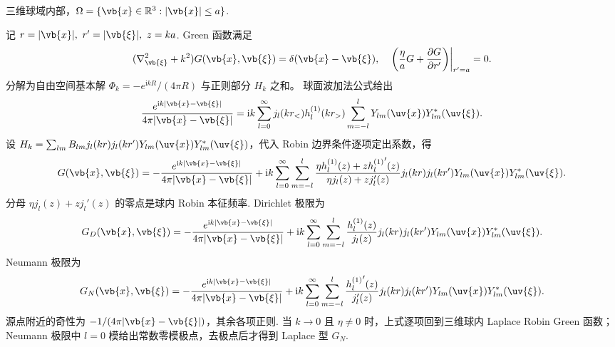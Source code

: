 \begin{example}
	三维球域内部，\(\Omega=\{\vb{x}\in\mathbb{R}^3:|\vb{x}|\leq a\}\).
	
	记 \(r=|\vb{x}|,\ r'=|\vb{\xi}|,\ z=ka\). Green 函数满足
	\begin{equation*}
		(\nabla_{\vb{\xi}}^2+k^2)G(\vb{x},\vb{\xi})=\delta(\vb{x}-\vb{\xi}),
		\quad
		\left.\left(\frac{\eta}{a}G+\frac{\partial G}{\partial r'}\right)\right|_{r'=a}=0.
	\end{equation*}
	分解为自由空间基本解 \(\Phi_k=-e^{\mathrm{i}kR}/(4\pi R)\) 与正则部分 \(H_k\) 之和。
	球面波加法公式给出
	\begin{equation*}
		\frac{e^{\mathrm{i}k|\vb{x}-\vb{\xi}|}}{4\pi|\vb{x}-\vb{\xi}|}=\mathrm{i}k\sum_{l=0}^{\infty}j_l(kr_<)h_l^{(1)}(kr_>)\sum_{m=-l}^{l}Y_{lm}(\uv{x})Y_{lm}^*(\uv{\xi}).
	\end{equation*}
	设 \(H_k=\sum_{lm}B_{lm}j_l(kr)j_l(kr')Y_{lm}(\uv{x})Y_{lm}^*(\uv{\xi})\)，代入 Robin 边界条件逐项定出系数，得
	\begin{equation*}
		G(\vb{x},\vb{\xi})=-\frac{e^{\mathrm{i}k|\vb{x}-\vb{\xi}|}}{4\pi|\vb{x}-\vb{\xi}|}
		+\mathrm{i}k\sum_{l=0}^{\infty}\sum_{m=-l}^{l}
		\frac{\eta h_l^{(1)}(z)+z{h_l^{(1)}}'(z)}{\eta j_l(z)+zj_l'(z)}
		j_l(kr)j_l(kr')Y_{lm}(\uv{x})Y_{lm}^*(\uv{\xi}).
	\end{equation*}
	分母 \(\eta j_l(z)+zj_l'(z)\) 的零点是球内 Robin 本征频率. Dirichlet 极限为
	\begin{equation*}
		G_D(\vb{x},\vb{\xi})=-\frac{e^{\mathrm{i}k|\vb{x}-\vb{\xi}|}}{4\pi|\vb{x}-\vb{\xi}|}
		+\mathrm{i}k\sum_{l=0}^{\infty}\sum_{m=-l}^{l}
		\frac{h_l^{(1)}(z)}{j_l(z)}j_l(kr)j_l(kr')Y_{lm}(\uv{x})Y_{lm}^*(\uv{\xi}).
	\end{equation*}
	Neumann 极限为
	\begin{equation*}
		G_N(\vb{x},\vb{\xi})=-\frac{e^{\mathrm{i}k|\vb{x}-\vb{\xi}|}}{4\pi|\vb{x}-\vb{\xi}|}
		+\mathrm{i}k\sum_{l=0}^{\infty}\sum_{m=-l}^{l}
		\frac{{h_l^{(1)}}'(z)}{j_l'(z)}j_l(kr)j_l(kr')Y_{lm}(\uv{x})Y_{lm}^*(\uv{\xi}).
	\end{equation*}
	源点附近的奇性为 \(-1/(4\pi|\vb{x}-\vb{\xi}|)\)，其余各项正则. 当 \(k\to0\) 且 \(\eta\neq0\) 时，上式逐项回到三维球内 Laplace Robin Green 函数；Neumann 极限中 \(l=0\) 模给出常数零模极点，去极点后才得到 Laplace 型 \(G_N\).
\end{example}

